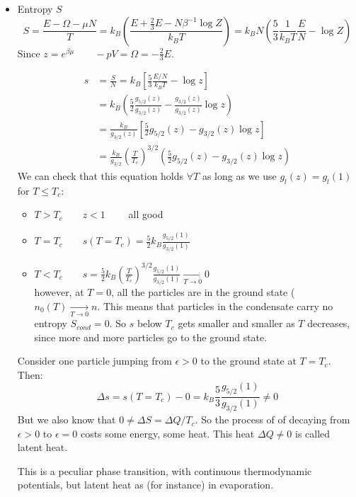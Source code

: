 \begin{itemize}
    \item Entropy $S$\\
    $$
        S = \frac{E-\Omega -\mu N}T = 
        k_B\left(\frac{E+\frac23 E-N\beta^{-1}\log Z}{k_BT}\right) =
        k_BN\left(\frac53\frac1{k_BT}\frac EN -\log Z\right)
    $$
    Since $z = e^{\beta\mu}\qquad -pV= \Omega = -\frac23 E$.

    \begin{align*}
        s &= \frac SN = k_B\left[\frac53\frac{E/N}{k_BT} - \log z\right]\\
        &= k_B\left(\frac52\frac{g_{5/2}(z)}{g_{3/2}(z)} - \frac{g_{3/2}(z)}{g_{3/2}(z)}\log z\right)\\
        &= \frac {k_B}{g_{3/2}(z)}\left[\frac52g_{5/2}(z) - g_{3/2}(z)\log z\right]\\
        &= \frac{k_B}{g_{3/2}} \left(\frac T{T_c}\right)^{3/2}\left(\frac52g_{5/2}(z) - g_{3/2}(z)\log z\right)
    \end{align*}
    We can check that this equation holds $\forall T$ as long as we use $g_l(z) = g_l(1)$ for $T \le T_c$:
    \begin{itemize}
        \item $T>T_c \qquad z<1\qquad$ all good
        \item $T=T_c \qquad s(T=T_c) = \frac52 k_B\frac{g_{5/2}(1)}{g_{3/2}(1)}$
        \item $T<T_c \qquad s = \frac52 k_B\left(\frac T{T_c}\right)^{3/2}\frac{g_{5/2}(1)}{g_{3/2}(1)} \xrightarrow[T\to 0]{}0$\\
        however, at $T=0$, all the particles are in the ground state ($n_0(T) \xrightarrow[T\to0]{}n$. This means that particles in the condensate carry no entropy $S_{cond} = 0$. So $s$ below $T_c$ gets smaller and smaller as $T$ decreases, since more and more particles go to the ground state.
    \end{itemize}
        
    Consider one particle jumping from $\epsilon > 0$ to the ground state at $T=T_c$. Then:
    $$ \Delta s = s(T=T_c) - 0 = k_B\frac 53 \frac{g_{5/2}(1)}{g_{3/2}(1)} \ne 0$$
    But we also know that $0 \ne \Delta S = \Delta Q / T_c$. So the process of of decaying from $\epsilon > 0$ to $\epsilon =0$ costs some energy, some heat. This heat $\Delta Q \ne 0$ is called latent heat.

    This is a peculiar phase transition, with continuous thermodynamic potentials, but latent heat as (for instance) in evaporation.

\end{itemize}

